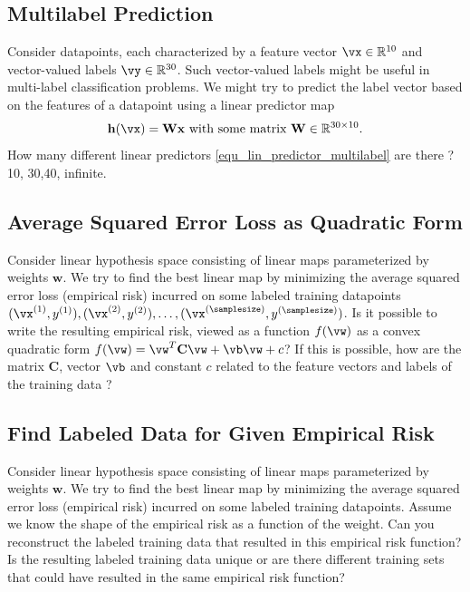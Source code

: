 \documentclass[12pt]{report}
\newcommand{\vh}{\mathbf{h}}
\begin{document}
\subsection{Multilabel Prediction} 
\label{ex_ch2_multilabel}
Consider datapoints, each characterized by a feature vector $\vx \in \mathbb{R}^{10}$ and 
vector-valued labels $\vy \in \mathbb{R}^{30}$. Such vector-valued labels might be useful 
in multi-label classification problems. We might try to predict the label vector based on the 
features of a datapoint using a linear predictor map 
\begin{equation}
\label{equ_lin_predictor_multilabel}
\vh(\vx) = \mathbf{W} \mathbf{x} \mbox{ with some matrix } \mathbf{W} \in \mathbb{R}^{30 \times 10}. 
\end{equation} 
How many different linear predictors \eqref{equ_lin_predictor_multilabel} are there ? 
10, 30,40, infinite. 




\subsection{Average Squared Error Loss as Quadratic Form} 
\label{ex_2_0}
Consider linear hypothesis space consisting of linear maps parameterized by 
weights $\mathbf{w}$. We try to find the best linear map by minimizing the average 
squared error loss (empirical risk) incurred on some labeled training datapoints 
$(\vx^{(1)},y^{(1)}),(\vx^{(2)},y^{(2)}),\ldots,(\vx^{(\samplesize)},y^{(\samplesize)})$.  
Is it possible to write the resulting empirical risk, viewed as a function $f(\vw)$ as 
a convex quadratic form $f(\vw) = \vw^{T} \mathbf{C} \vw + \vb \vw + c$? If this 
is possible, how are the matrix $\mathbf{C}$, vector $\vb$ and constant $c$ related 
to the feature vectors and labels of the training data ? 


\subsection{Find Labeled Data for Given Empirical Risk} 
\label{ex_2_1}
Consider linear hypothesis space consisting of linear maps parameterized by 
weights $\mathbf{w}$. We try to find the best linear map by minimizing the average 
squared error loss (empirical risk) incurred on some labeled training datapoints. 
Assume we know the shape of the empirical risk as a function of the weight. 
Can you reconstruct the labeled training data that resulted in this empirical risk 
function? Is the resulting labeled training data unique or are there different training sets 
that could have resulted in the same empirical risk function? 
\end{document}
